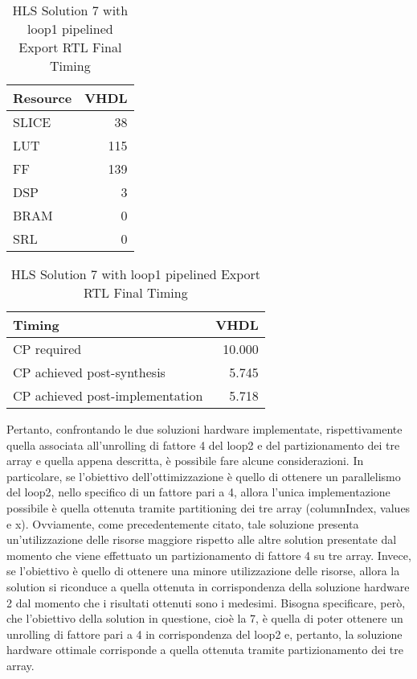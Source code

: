 \begin{table}[H]
	\centering
	\begin{minipage}[t]{0.45\linewidth}
		\centering
		\begin{tabular}{|l|r|}
			\hline
			\textbf{Resource} & \textbf{VHDL} \\
			\hline
			SLICE & 38 \\
			\hline
			LUT & 115 \\
			\hline
			FF & 139 \\
			\hline
			DSP & 3 \\
			\hline
			BRAM & 0 \\
			\hline
			SRL & 0 \\
			\hline
		\end{tabular}
		\caption{HLS Solution 7 with loop1 pipelined Export RTL Resource Usage}
		\label{tab:hls-solution-7-loop1-pipeline-export-rtl-resoruce-usage}
	\end{minipage}
	\hfill
	\begin{minipage}[t]{0.45\linewidth}
		\centering
		\begin{tabular}{|l|r|}
			\hline
			\textbf{Timing} & \textbf{VHDL} \\
			\hline
			CP required & 10.000 \\
			\hline
			CP achieved post-synthesis & 5.745 \\
			\hline
			CP achieved post-implementation & 5.718 \\
			\hline
		\end{tabular}
		\caption{HLS Solution 7 with loop1 pipelined Export RTL Final Timing}
		\label{tab:hls-solution-7-loop1-pipeline-export-rtl-final-timing}
	\end{minipage}
\end{table}

Pertanto, confrontando le due soluzioni hardware implementate, rispettivamente quella associata all'unrolling di fattore 4 del loop2 e del partizionamento dei tre array e quella appena descritta, è possibile fare alcune considerazioni. In particolare, se l'obiettivo dell'ottimizzazione è quello di ottenere un parallelismo del loop2, nello specifico di un fattore pari a 4, allora l'unica implementazione possibile è quella ottenuta tramite partitioning dei tre array (columnIndex, values e x). Ovviamente, come precedentemente citato, tale soluzione presenta un'utilizzazione delle risorse maggiore rispetto alle altre solution presentate dal momento che viene effettuato un partizionamento di fattore 4 su tre array. Invece, se l'obiettivo è quello di ottenere una minore utilizzazione delle risorse, allora la solution si riconduce a quella ottenuta in corrispondenza della soluzione hardware 2 dal momento che i risultati ottenuti sono i medesimi. Bisogna specificare, però, che l'obiettivo della solution in questione, cioè la 7, è quella di poter ottenere un unrolling di fattore pari a 4 in corrispondenza del loop2 e, pertanto, la soluzione hardware ottimale corrisponde a quella ottenuta tramite partizionamento dei tre array.
